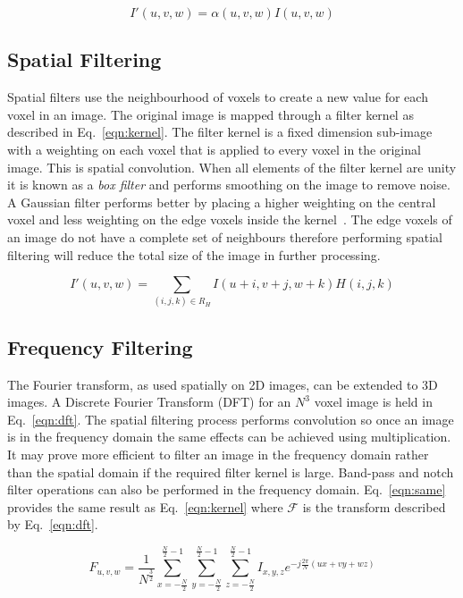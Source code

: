 \documentclass[journal]{IEEEtran}
\begin{document}
\begin{equation}
	I'(u,v,w) = \alpha(u,v,w)I(u,v,w)
	\label{eqn:point} 
\end{equation}



\subsection{Spatial Filtering}
\label{sec:spatial}
Spatial filters use the neighbourhood of voxels to create a new value for each voxel in an image. 
The original image is mapped through a filter kernel as described in Eq.~\eqref{eqn:kernel}.
The filter kernel is a fixed dimension sub-image with a weighting on each voxel that is applied to every voxel in the original image.
This is spatial convolution.
When all elements of the filter kernel are unity it is known as a \emph{box filter} and performs smoothing on the image to remove noise.
A Gaussian filter performs better by placing a higher weighting on the central voxel and less weighting on the edge voxels inside the kernel~\cite{lohmann1998volumetric}.
The edge voxels of an image do not have a complete set of neighbours therefore performing spatial filtering will reduce the total size of the image in further processing.

\begin{equation}
	I'(u,v,w) = \sum\limits_{(i,j,k) \in R_H} I(u + i,v + j, w + k)H(i,j,k)
	\label{eqn:kernel} 
\end{equation}



\subsection{Frequency Filtering}
The Fourier transform, as used spatially on 2D images, can be extended to 3D images.
A Discrete Fourier Transform (DFT) for an $N^3$ voxel image is held in Eq.~\eqref{eqn:dft}.
The spatial filtering process performs convolution so once an image is in the frequency domain the same effects can be achieved using multiplication.
It may prove more efficient to filter an image in the frequency domain rather than the spatial domain if the required filter kernel is large.
Band-pass and notch filter operations can also be performed in the frequency domain.
Eq.~\eqref{eqn:same} provides the same result as Eq.~\eqref{eqn:kernel} where $\mathcal{F}$ is the transform described by Eq.~\eqref{eqn:dft}.

\begin{equation}
	F_{u,v,w} = \frac{1}{N^{\frac{3}{2}}} \sum\limits_{x=-\frac{N}{2}}^{\frac{N}{2}-1}\sum\limits_{y=-\frac{N}{2}}^{\frac{N}{2}-1}\sum\limits_{z=-\frac{N}{2}}^{\frac{N}{2}-1}I_{x,y,z}e^{-j\frac{2\pi}{N}(ux + vy + wz)}
	\label{eqn:dft} 
\end{equation}
\end{document}

